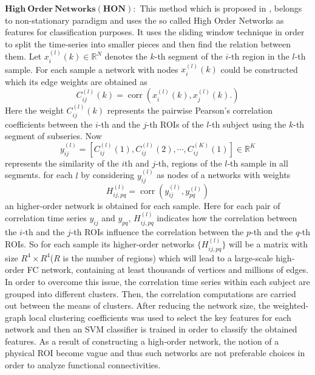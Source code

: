 \documentclass[preprint,12pt]{elsarticle}
\begin{document}
	$\mathbf{High~Order~Networks(HON):}$
	This method which is proposed in \cite{r63.5}, belongs to non-stationary paradigm and uses the so called
	High Order Networks as features for classification purposes. It uses the sliding window technique  in order to split the time-series into smaller pieces and then find the relation between them\cite{r51,r51.5,r52}. Let $x_{i}^{(l)}(k) \in \mathbb{R}^N$ denotes the $k$-th segment
	of the $i$-th region in the $l$-th sample. For each sample a network with  nodes $x_{i}^{(l)}(k)$ could be constructed which its edge weights are obtained as
	\[
	C_{ij}^{(l)}(k) = \operatorname{corr}\left(x_{i}^{(l)}(k),x_{j}^{(l)}(k).
	\right)
	\]
	Here the weight $C_{ij}^{(l)}(k)$ represents the pairwise Pearson’s correlation coefficients
	between the $i$-th and the $j$-th ROIs of the $l$-th subject using the $k$-th segment of subseries. 
	Now
	\[
	y_{ij}^{(l)} = \left[ 
	C_{ij}^{(l)}(1), C_{ij}^{(l)}(2), \cdots , C_{ij}^{(K)}(1) 
	\right] \in \mathbb{R}^K
	\]
	represents the similarity of the $i$th and $j$-th, regions of the $l$-th sample in all segments. for each  $l$ by considering $y_{ij}^{(l)}$ as nodes of a networks with weights 
	\[
	H_{ij,pq}^{(l)} = \operatorname{corr} \left(
	y_{ij}^{(l)},y_{pq}^{(l)}
	\right)
	\]
	an higher-order network is obtained for each sample. Here 
	for each pair of correlation time series $y_{ij}$ and $y_{pq}$, $H_{ij,pq}^{(l)}$ indicates how the correlation between the $i$-th and the $j$-th ROIs influence the correlation between the $p$-th and the $q$-th ROIs. So for each sample its higher-order networks 
	$\{ H_{ij,pq}^{(l)} \}$ will be a matrix with size $R^4\times R^4$($R$ is the number of regions)
	which will lead to a large-scale high-order FC
	network, containing at least thousands of vertices and millions
	of edges. 
	In order to overcome this issue, the correlation time series within each subject are grouped into different clusters. Then, the correlation computations are carried out between the means of clusters. After reducing the network size, the
	weighted-graph local clustering coefficients was used to select the key features for each network and then an SVM classifier is trained in order to classify the obtained features. As a result of constructing a high-order network, the notion of a physical ROI become vague and thus such networks are not preferable choices in order to analyze functional connectivities. 
	
\end{document}
